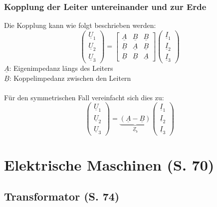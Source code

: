 \documentclass[a4paper,twocolumn,10pt]{article}
\begin{document}
\subsubsection{Kopplung der Leiter untereinander und zur Erde}
Die Kopplung kann wie folgt beschrieben werden:
\begin{equation*}
\begin{pmatrix}\underline{U}_1 \\ \underline{U}_2 \\ \underline{U}_3\end{pmatrix}=\begin{bmatrix}\underline{A} & \underline{B} & \underline{B} \\ \underline{B} & \underline{A} & \underline{B} \\ \underline{B} & \underline{B} & \underline{A}\end{bmatrix}\begin{pmatrix}\underline{I}_1 \\ \underline{I}_2 \\ \underline{I}_3\end{pmatrix}
\end{equation*}
$\underline{A}$: Eigenimpedanz längs des Leiters\\
$\underline{B}$: Koppelimpedanz zwischen den Leitern\\\\
Für den symmetrischen Fall vereinfacht sich dies zu:
\begin{equation*}
\begin{pmatrix}\underline{U}_1 \\ \underline{U}_2 \\ \underline{U}_3\end{pmatrix}=\underbrace{(\underline{A}-\underline{B})}_{\underline{Z}_b}\begin{pmatrix}\underline{I}_1 \\ \underline{I}_2 \\ \underline{I}_3\end{pmatrix}
\end{equation*}

\newpage

\section{Elektrische Maschinen (S. 70)}

\subsection{Transformator (S. 74)}
\end{document}
